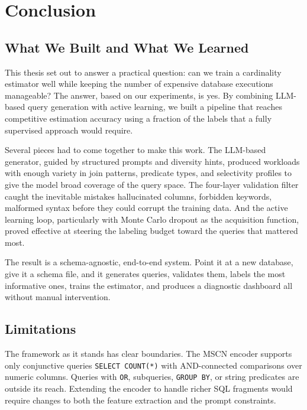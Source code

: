 \chapter{Conclusion}
\label{chap:conclusion}
\pagestyle{plain}

\section{What We Built and What We Learned}

This thesis set out to answer a practical question: can we train a cardinality estimator well while keeping the number of expensive database executions manageable? The answer, based on our experiments, is yes. By combining LLM-based query generation with active learning, we built a pipeline that reaches competitive estimation accuracy using a fraction of the labels that a fully supervised approach would require.

Several pieces had to come together to make this work. The LLM-based generator, guided by structured prompts and diversity hints, produced workloads with enough variety in join patterns, predicate types, and selectivity profiles to give the model broad coverage of the query space. The four-layer validation filter caught the inevitable mistakes hallucinated columns, forbidden keywords, malformed syntax before they could corrupt the training data. And the active learning loop, particularly with Monte Carlo dropout as the acquisition function, proved effective at steering the labeling budget toward the queries that mattered most.

The result is a schema-agnostic, end-to-end system. Point it at a new database, give it a schema file, and it generates queries, validates them, labels the most informative ones, trains the estimator, and produces a diagnostic dashboard all without manual intervention.


\section{Limitations}

The framework as it stands has clear boundaries. The MSCN encoder supports only conjunctive queries \texttt{SELECT COUNT(*)} with AND-connected comparisons over numeric columns. Queries with \texttt{OR}, subqueries, \texttt{GROUP BY}, or string predicates are outside its reach. Extending the encoder to handle richer SQL fragments would require changes to both the feature extraction and the prompt constraints.


